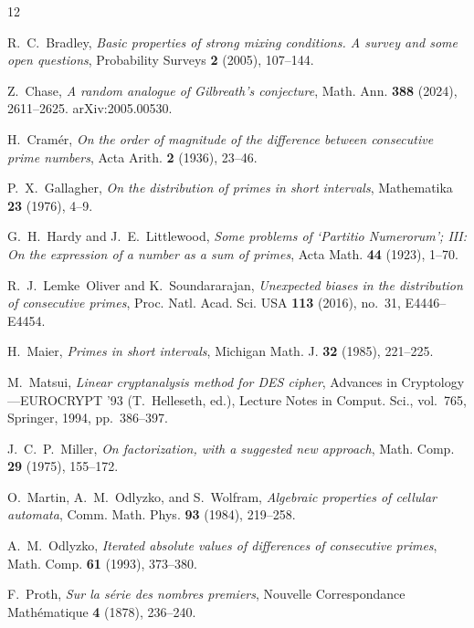 \documentclass[11pt, a4paper]{amsart}
\theoremstyle{plain}
\theoremstyle{definition}
\begin{document}
\begin{thebibliography}{12}

R.~C.~Bradley, \textit{Basic properties of strong mixing conditions. A survey and some open questions}, Probability Surveys \textbf{2} (2005), 107--144.

Z.~Chase, \textit{A random analogue of Gilbreath's conjecture}, Math. Ann. \textbf{388} (2024), 2611--2625. arXiv:2005.00530.

H.~Cram\'er, \textit{On the order of magnitude of the difference between consecutive prime numbers}, Acta Arith. \textbf{2} (1936), 23--46.

P.~X.~Gallagher, \textit{On the distribution of primes in short intervals}, Mathematika \textbf{23} (1976), 4--9.

G.~H.~Hardy and J.~E.~Littlewood, \textit{Some problems of `Partitio Numerorum'; III: On the expression of a number as a sum of primes}, Acta Math. \textbf{44} (1923), 1--70.

R.~J.~Lemke~Oliver and K.~Soundararajan, \textit{Unexpected biases in the distribution of consecutive primes}, Proc. Natl. Acad. Sci. USA \textbf{113} (2016), no.~31, E4446--E4454.

H.~Maier, \textit{Primes in short intervals}, Michigan Math. J. \textbf{32} (1985), 221--225.

M.~Matsui, \textit{Linear cryptanalysis method for DES cipher}, Advances in Cryptology---EUROCRYPT '93 (T.~Helleseth, ed.), Lecture Notes in Comput. Sci., vol.~765, Springer, 1994, pp.~386--397.

J.~C.~P.~Miller, \textit{On factorization, with a suggested new approach}, Math. Comp. \textbf{29} (1975), 155--172.

O.~Martin, A.~M.~Odlyzko, and S.~Wolfram, \textit{Algebraic properties of cellular automata}, Comm. Math. Phys. \textbf{93} (1984), 219--258.

A.~M.~Odlyzko, \textit{Iterated absolute values of differences of consecutive primes}, Math. Comp. \textbf{61} (1993), 373--380.

F.~Proth, \textit{Sur la s\'erie des nombres premiers}, Nouvelle Correspondance Math\'ematique \textbf{4} (1878), 236--240.

\end{thebibliography}
\end{document}
